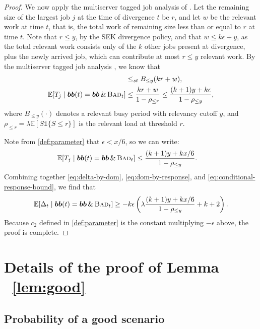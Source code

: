 \documentclass[acmsmall]{acmart}
\newcommand{\ind}[1]{\mathds{1}\{#1\}}
\newcommand{\E}[1]{\mathbb{E}[#1]}
\newcommand{\bb}{\boldsymbol{b}}
\newcommand{\bbb}{\bb\bb}
\newcommand{\bad}{\textsc{Bad}}
\begin{document}
\begin{proof}
    We now apply the multiserver tagged job analysis of \cite{grosof-etal-2019-srpt-k}.
    Let the remaining size of the largest job $j$ at the time of divergence $t$ be $r$,
    and let $w$ be the relevant work at time $t$, that is, the total work of remaining size less than or equal to $r$ at time $t$.
    Note that $r \le y$, by the SEK divergence policy,
    and that $w \le k \epsilon + y$,
    as the total relevant work consists only of the $k$ other jobs present at divergence,
    plus the newly arrived job, which can contribute at most $r \le y$ relevant work.
    By the multiserver tagged job analysis \cite[eq. 5.1 and Lemma 1]{grosof-etal-2019-srpt-k}, we know that
    \begin{align*}
        [T_j \mid\bbb(t) = \bbb \,\&\, \bad_t] &\le_{st} B_{\le y}(kr + w), \\
        \E{T_j \mid\bbb(t) = \bbb \,\&\, \bad_t} &\le \frac{kr + w}{1-\rho_{\le r}} \le \frac{(k+1)y + k\epsilon}{1-\rho_{\le y}},
    \end{align*}
    where $B_{\le y}(\cdot)$ denotes a relevant busy period with relevancy cutoff $y$,
    and $\rho_{\le r} = \lambda \E{S \ind{S \le r}}$ is the relevant load at threshold $r$.

    Note from \cref{def:parameter} that $\epsilon < x/6$, so we can write:
    \begin{align}
        \label{eq:conditional-response-bound}
        \E{T_j \mid\bbb(t) = \bbb \,\&\, \bad_t} &\le  \frac{(k+1)y + kx/6}{1-\rho_{\le y}}.
    \end{align}
    Combining together \eqref{eq:delta-by-dom}, \eqref{eq:dom-by-response}, and \eqref{eq:conditional-response-bound},
    we find that
    \begin{align*}
        \E{\Delta_t \mid\bbb(t) = \bbb \,\&\, \bad_t} \ge - k \epsilon \left(\lambda \frac{(k+1)y + kx/6}{1-\rho_{\le y}} + k+2\right).
    \end{align*}
    Because $c_2$ defined in \cref{def:parameter} is the constant multiplying $-\epsilon$ above, the proof is complete.
\end{proof}



\section[Details of the proof of Lemma ~\ref{lem:good}]{Details of the proof of Lemma ~\ref{lem:good}}


\subsection{Probability of a good scenario}
\label{ap:good-probabilities}
\end{document}
